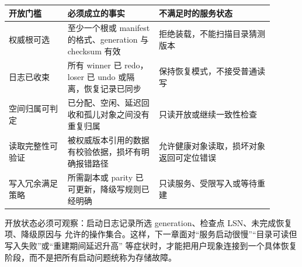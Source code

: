 \begin{longtable}{|L{0.2\linewidth}|L{0.31\linewidth}|L{0.39\linewidth}|}
\hline
开放门槛 & 必须成立的事实 & 不满足时的服务状态 \\ \hline
权威根可选 & 至少一个根或 manifest 的格式、generation 与 checksum 有效 &
拒绝装载，不能扫描目录猜测版本 \\\tablerowrule
日志已收束 & 所有 winner 已 redo，loser 已 undo 或隔离，恢复记录已同步 &
保持恢复模式，不接受普通读写 \\\tablerowrule
空间归属可判定 & 已分配、空闲、延迟回收和孤儿对象之间没有重复归属 &
只读开放或继续一致性检查 \\\tablerowrule
读取完整性可验证 & 被权威版本引用的数据有校验依据，损坏有明确报错路径 &
允许健康对象读取，损坏对象返回可定位错误 \\\tablerowrule
写入冗余满足策略 & 所需副本或 parity 已可更新，降级写规则已经明确 &
只读服务、受限写入或等待重建 \\
\hline
\end{longtable}

开放状态必须可观察：启动日志记录所选 generation、检查点 LSN、未完成恢复项、降级原因与
允许的操作集合。这样，下一章面对“服务启动很慢”“目录可读但写入失败”或“重建期间延迟升高”
等症状时，才能把用户现象连接到一个具体恢复阶段，而不是把所有启动问题统称为存储故障。
